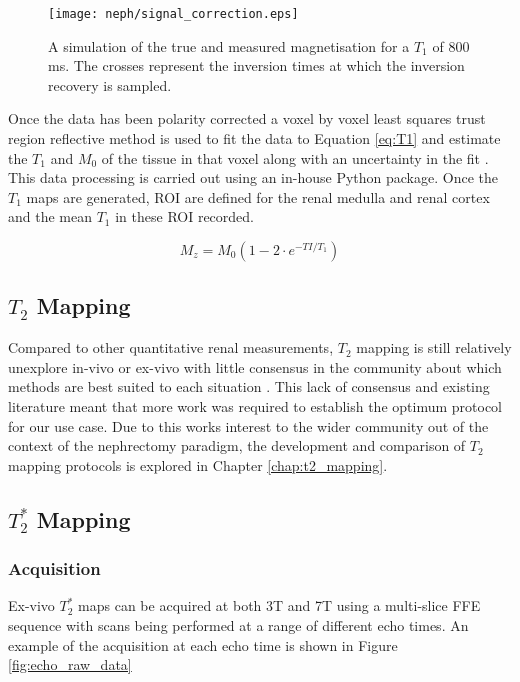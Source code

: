 \begin{figure}[H]
	\centering
	\texttt{[image: neph/signal\_correction.eps]}
	\caption{A simulation of the true and measured magnetisation for a $T_1$ of 800 ms. The crosses represent the inversion times at which the inversion recovery is sampled.}
	\label{fig:sig_correction}	
\end{figure}

Once the data has been polarity corrected a voxel by voxel least squares trust region reflective  method is used to fit the data to Equation \eqref{eq:T1} and estimate the $T_1$ and $M_0$ of the tissue in that voxel along with an uncertainty in the fit \cite{branch_subspace_1999}. This data processing is carried out using an in-house Python package. Once the $T_1$ maps are generated, \ac{ROI} are defined for the renal medulla and renal cortex and the mean $T_1$ in these \ac{ROI} recorded.

\begin{equation}
M_z = M_0 \left(1-2\cdot e^{-TI/T_1}\right)
\label{eq:T1}
\end{equation}

\subsection{$T_2$ Mapping}
\label{subsec:neph_t2_mapping}

Compared to other quantitative renal measurements, $T_2$ mapping is still relatively unexplore in-vivo or ex-vivo with little consensus in the community about which methods are best suited to each situation \cite{dekkers_consensus-based_2019}. This lack of consensus and existing literature meant that more work was required to establish the optimum protocol for our use case. Due to this works interest to the wider community out of the context of the nephrectomy paradigm, the development and comparison of $T_2$ mapping protocols is explored in Chapter \ref{chap:t2_mapping}.

\subsection{$T_2^*$ Mapping}
\subsubsection{Acquisition}

Ex-vivo $T_2^*$ maps can be acquired at both 3T and 7T using a multi-slice \ac{FFE} sequence with scans being performed at a range of different echo times. An example of the acquisition at each echo time is shown in Figure \ref{fig:echo_raw_data}

